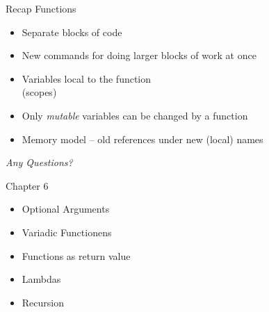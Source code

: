 
\begin{frame}[t,plain]
\titlepage
\end{frame}


\begin{frame}{Recap}
%
Functions
\begin{itemize}
\item Separate blocks of code
\item New commands for doing larger blocks of work at once
\item Variables local to the function\\
	(\thus scopes)
\item Only \emph{mutable} variables can be changed by a function
\item Memory model -- old references under new (local) names
\end{itemize}
%
\begin{center}
	\emph{Any Questions?}
\end{center}
%
\end{frame}


\begin{frame}[fragile]{Chapter 6}
%
\begin{itemize}
\item Optional Arguments
\item Variadic Functionens
\item Functions as return value
\item Lambdas
\item Recursion
\end{itemize}
%
\end{frame}


